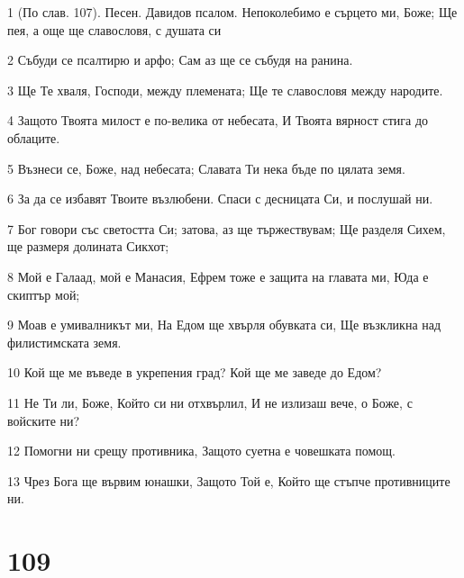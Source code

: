 \par 1 (По слав. 107). Песен. Давидов псалом. Непоколебимо е сърцето ми, Боже; Ще пея, а още ще славословя, с душата си
\par 2 Събуди се псалтирю и арфо; Сам аз ще се събудя на ранина.
\par 3 Ще Те хваля, Господи, между племената; Ще те славословя между народите.
\par 4 Защото Твоята милост е по-велика от небесата, И Твоята вярност стига до облаците.
\par 5 Възнеси се, Боже, над небесата; Славата Ти нека бъде по цялата земя.
\par 6 За да се избавят Твоите възлюбени. Спаси с десницата Си, и послушай ни.
\par 7 Бог говори със светостта Си; затова, аз ще тържествувам; Ще разделя Сихем, ще размеря долината Сикхот;
\par 8 Мой е Галаад, мой е Манасия, Ефрем тоже е защита на главата ми, Юда е скиптър мой;
\par 9 Моав е умивалникът ми, На Едом ще хвърля обувката си, Ще възкликна над филистимската земя.
\par 10 Кой ще ме въведе в укрепения град? Кой ще ме заведе до Едом?
\par 11 Не Ти ли, Боже, Който си ни отхвърлил, И не излизаш вече, о Боже, с войските ни?
\par 12 Помогни ни срещу противника, Защото суетна е човешката помощ.
\par 13 Чрез Бога ще вървим юнашки, Защото Той е, Който ще стъпче противниците ни.

\chapter{109}

